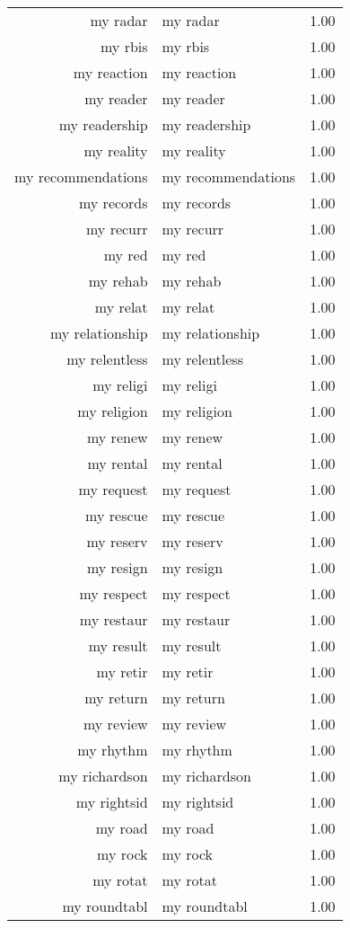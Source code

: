 \begin{table}[ht]
\begin{tabular}{rlr}
  my radar & my radar & 1.00 \\ 
  my rbis & my rbis & 1.00 \\ 
  my reaction & my reaction & 1.00 \\ 
  my reader & my reader & 1.00 \\ 
  my readership & my readership & 1.00 \\ 
  my reality & my reality & 1.00 \\ 
  my recommendations & my recommendations & 1.00 \\ 
  my records & my records & 1.00 \\ 
  my recurr & my recurr & 1.00 \\ 
  my red & my red & 1.00 \\ 
  my rehab & my rehab & 1.00 \\ 
  my relat & my relat & 1.00 \\ 
  my relationship & my relationship & 1.00 \\ 
  my relentless & my relentless & 1.00 \\ 
  my religi & my religi & 1.00 \\ 
  my religion & my religion & 1.00 \\ 
  my renew & my renew & 1.00 \\ 
  my rental & my rental & 1.00 \\ 
  my request & my request & 1.00 \\ 
  my rescue & my rescue & 1.00 \\ 
  my reserv & my reserv & 1.00 \\ 
  my resign & my resign & 1.00 \\ 
  my respect & my respect & 1.00 \\ 
  my restaur & my restaur & 1.00 \\ 
  my result & my result & 1.00 \\ 
  my retir & my retir & 1.00 \\ 
  my return & my return & 1.00 \\ 
  my review & my review & 1.00 \\ 
  my rhythm & my rhythm & 1.00 \\ 
  my richardson & my richardson & 1.00 \\ 
  my rightsid & my rightsid & 1.00 \\ 
  my road & my road & 1.00 \\ 
  my rock & my rock & 1.00 \\ 
  my rotat & my rotat & 1.00 \\ 
  my roundtabl & my roundtabl & 1.00 \\ 

\end{tabular}
\end{table}
